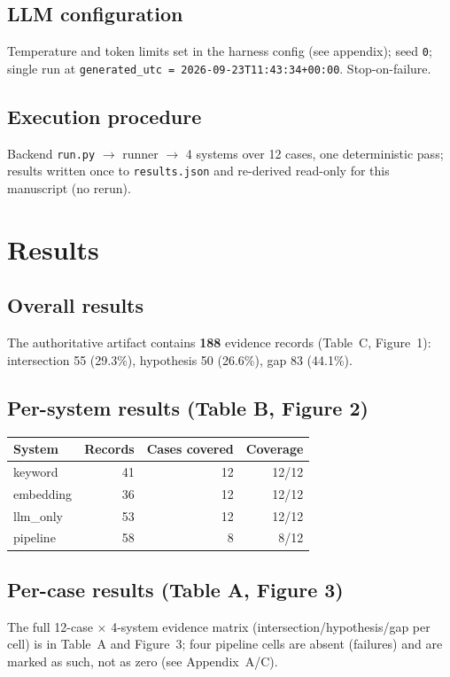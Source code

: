 \documentclass[11pt]{article}
\begin{document}
\subsection{LLM configuration}
Temperature and token limits set in the harness config (see appendix); seed
\texttt{0}; single run at \texttt{generated\_utc = 2026-09-23T11:43:34+00:00}.
Stop-on-failure.

\subsection{Execution procedure}
Backend \texttt{run.py} $\rightarrow$ runner $\rightarrow$ 4 systems over 12
cases, one deterministic pass; results written once to \texttt{results.json} and
re-derived read-only for this manuscript (no rerun).

\section{Results}
\label{sec:results}

\subsection{Overall results}
The authoritative artifact contains \textbf{188} evidence records (Table~C,
Figure~1):
intersection 55 (29.3\%), hypothesis 50 (26.6\%), gap 83 (44.1\%).

\subsection{Per-system results (Table B, Figure 2)}
\begin{center}
\begin{tabular}{lrrr}
\toprule
\textbf{System} & \textbf{Records} & \textbf{Cases covered} & \textbf{Coverage} \\
\midrule
keyword  & 41 & 12 & 12/12 \\
embedding& 36 & 12 & 12/12 \\
llm\_only& 53 & 12 & 12/12 \\
pipeline & 58 & 8 & 8/12 \\
\bottomrule
\end{tabular}
\end{center}

\subsection{Per-case results (Table A, Figure 3)}
The full 12-case $\times$ 4-system evidence matrix (intersection/hypothesis/gap
per cell) is in Table~A and Figure~3; four pipeline cells are absent (failures)
and are marked as such, not as zero (see Appendix~A/C).
\end{document}
